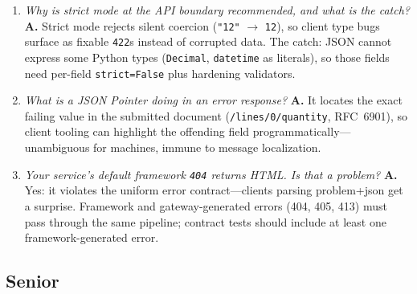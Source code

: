 \begin{enumerate}[label=\textbf{Q\arabic*.}, leftmargin=3.2em, start=9]
        unavailability (shedding, maintenance, open breaker)---usually
        self-healing, pair with \texttt{Retry-After}. \texttt{504}: upstream
        never answered in time. The distinction drives paging, retry policy,
        and which dashboard lights up.
  \item \emph{Why is strict mode at the API boundary recommended, and what
        is the catch?} \textbf{A.} Strict mode rejects silent coercion
        (\texttt{"12"} $\rightarrow$ \texttt{12}), so client type bugs
        surface as fixable \texttt{422}s instead of corrupted data. The
        catch: JSON cannot express some Python types (\texttt{Decimal},
        \texttt{datetime} as literals), so those fields need per-field
        \texttt{strict=False} plus hardening validators.
  \item \emph{What is a JSON Pointer doing in an error response?}
        \textbf{A.} It locates the exact failing value in the submitted
        document (\texttt{/lines/0/quantity}, RFC~6901), so client tooling
        can highlight the offending field programmatically---unambiguous for
        machines, immune to message localization.
  \item \emph{Your service's default framework \texttt{404} returns HTML.
        Is that a problem?} \textbf{A.} Yes: it violates the uniform error
        contract---clients parsing problem+json get a surprise. Framework
        and gateway-generated errors (404, 405, 413) must pass through the
        same pipeline; contract tests should include at least one
        framework-generated error.
\end{enumerate}

\subsection*{Senior}

